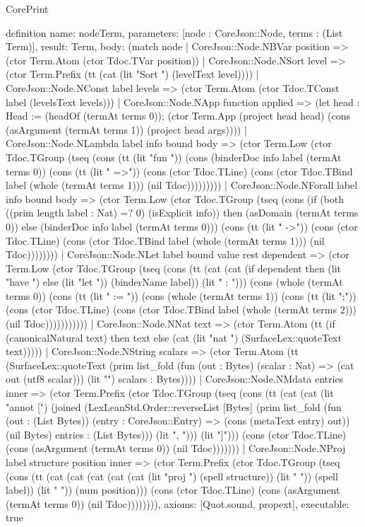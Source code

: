 \begin{lexlean}{CorePrint}
\begin{semanticmodule}
definition{
  name: nodeTerm,
  parameters: [node : CoreJson::Node, terms : (List Term)],
  result: Term,
  body: (match node
    | CoreJson::Node.NBVar position => (ctor Term.Atom (ctor Tdoc.TVar position))
    | CoreJson::Node.NSort level => (ctor Term.Prefix (tt (cat (lit "Sort ") (levelText level))))
    | CoreJson::Node.NConst label levels => (ctor Term.Atom (ctor Tdoc.TConst label (levelsText levels)))
    | CoreJson::Node.NApp function applied => (let head : Head := (headOf (termAt terms 0)); (ctor Term.App (project head head) (cons (asArgument (termAt terms 1)) (project head args))))
    | CoreJson::Node.NLambda label info bound body => (ctor Term.Low (ctor Tdoc.TGroup (tseq (cons (tt (lit "fun ")) (cons (binderDoc info label (termAt terms 0)) (cons (tt (lit " =>")) (cons (ctor Tdoc.TLine) (cons (ctor Tdoc.TBind label (whole (termAt terms 1))) (nil Tdoc)))))))))
    | CoreJson::Node.NForall label info bound body => (ctor Term.Low (ctor Tdoc.TGroup (tseq (cons (if (both ((prim length label : Nat) =? 0) (isExplicit info)) then (asDomain (termAt terms 0)) else (binderDoc info label (termAt terms 0))) (cons (tt (lit " ->")) (cons (ctor Tdoc.TLine) (cons (ctor Tdoc.TBind label (whole (termAt terms 1))) (nil Tdoc))))))))
    | CoreJson::Node.NLet label bound value rest dependent => (ctor Term.Low (ctor Tdoc.TGroup (tseq (cons (tt (cat (cat (if dependent then (lit "have ") else (lit "let ")) (binderName label)) (lit " : "))) (cons (whole (termAt terms 0)) (cons (tt (lit " := ")) (cons (whole (termAt terms 1)) (cons (tt (lit ";")) (cons (ctor Tdoc.TLine) (cons (ctor Tdoc.TBind label (whole (termAt terms 2))) (nil Tdoc)))))))))))
    | CoreJson::Node.NNat text => (ctor Term.Atom (tt (if (canonicalNatural text) then text else (cat (lit "nat ") (SurfaceLex::quoteText text)))))
    | CoreJson::Node.NString scalars => (ctor Term.Atom (tt (SurfaceLex::quoteText (prim list_fold (fun (out : Bytes) (scalar : Nat) => (cat out (utf8 scalar))) (lit "") scalars : Bytes))))
    | CoreJson::Node.NMdata entries inner => (ctor Term.Prefix (ctor Tdoc.TGroup (tseq (cons (tt (cat (cat (lit "annot [") (joined (LexLeanStd.Order::reverseList [Bytes] (prim list_fold (fun (out : (List Bytes)) (entry : CoreJson::Entry) => (cons (metaText entry) out)) (nil Bytes) entries : (List Bytes))) (lit ", "))) (lit "]"))) (cons (ctor Tdoc.TLine) (cons (asArgument (termAt terms 0)) (nil Tdoc)))))))
    | CoreJson::Node.NProj label structure position inner => (ctor Term.Prefix (ctor Tdoc.TGroup (tseq (cons (tt (cat (cat (cat (cat (cat (lit "proj ") (spell structure)) (lit " ")) (spell label)) (lit " ")) (num position))) (cons (ctor Tdoc.TLine) (cons (asArgument (termAt terms 0)) (nil Tdoc)))))))),
  axioms: [Quot.sound, propext],
  executable: true
}


\end{semanticmodule}
\end{lexlean}

